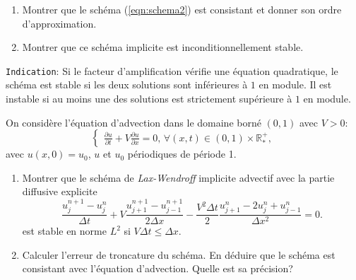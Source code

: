 \documentclass[12pt,a4paper]{article}
\begin{document}
\begin{enumerate}
\item Montrer que le schéma (\ref{eqn:schema2}) est consistant et donner son ordre d'approximation.
\item Montrer que ce sch\'ema implicite est inconditionnellement stable. 
\end{enumerate}
\texttt{Indication}: Si le facteur d'amplification vérifie une équation quadratique, le schéma est stable si les deux solutions sont inférieures à $1$ en module. Il est instable si au moins une des solutions est strictement supérieure à $1$ en module.\\


\noindent On considère l'\'equation d'advection dans le domaine born\'e $(0,1)$ avec $V>0$:
$$
\begin{cases}
\displaystyle\frac{\partial u}{\partial t}+V\frac{\partial u}{\partial
  x}=0,\, \forall (x,t)\in(0,1)\times\mathbb{R}^+_*,
\end{cases}
$$
avec $u(x, 0) = u_0$, $u$ et $u_0$ p\'eriodiques de p\'eriode 1. \\

\begin{enumerate}
\item Montrer que le sch\'ema de {\it Lax-Wendroff} implicite advectif avec la partie diffusive explicite
$$
\frac{u_j^{n+1}-u_{j}^{n}}{\Delta t}+V
\frac{u_{j+1}^{n+1}-u_{j-1}^{n+1}}{2\Delta x}-\frac{V^2\Delta t}{2}\frac{u_{j+1}^{n}-2u_j^n+u_{j-1}^{n}}{\Delta x^2}=0.
$$
est stable en norme $L^2$ si $V\Delta t \le \Delta x$. \\

\item Calculer l'erreur de troncature du sch\'ema.
En d\'eduire que le sch\'ema est consistant avec l'\'equation d'advection. Quelle est sa précision? 
\end{enumerate}
\end{document}
